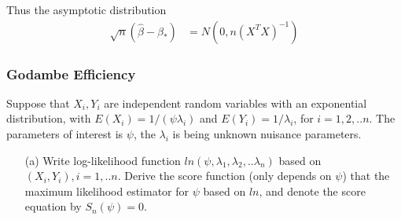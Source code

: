 \documentclass[11pt]{article} %
\begin{document}
Thus the asymptotic distribution
\begin{align*}
	\sqrt{n} (\hat{\beta} - \beta_{\ast}) &=N(0, n(X^T X)^{-1}) 
\end{align*}

\subsubsection{Godambe Efficiency}


Suppose that $X_i, Y_i$ are independent random variables with an exponential distribution, with $E(X_i)= 1/(\psi \lambda_i)$ and $E(Y_i) = 1/\lambda_i$, for $i=1,2,..n$. The parameters of interest is $\psi$, the $\lambda_i$ is being unknown nuisance parameters.

\begin{itemize}
	\item [(a)] Write log-likelihood function $ln(\psi, \lambda_1, \lambda_2, ..\lambda_n)$ based on $(X_i, Y_i), i=1,..n$. Derive the score function (only depends on $\psi$) that the maximum likelihood estimator for $\psi$ based on $ln$, and denote the score equation by $S_n(\psi) = 0$.
	
\end{itemize}
  
\end{document}
